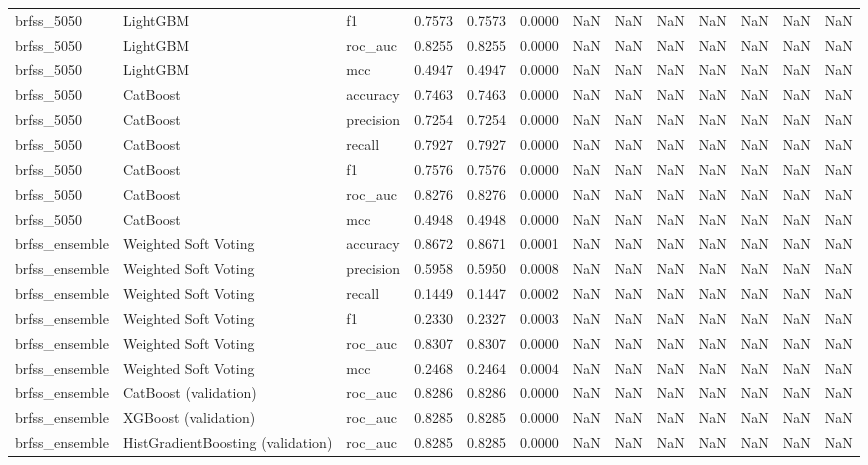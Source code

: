 \begin{tabular}{lllrrrllrrrrr}
brfss\_5050 & LightGBM & f1 & 0.7573 & 0.7573 & 0.0000 & NaN & NaN & NaN & NaN & NaN & NaN & NaN \\
brfss\_5050 & LightGBM & roc\_auc & 0.8255 & 0.8255 & 0.0000 & NaN & NaN & NaN & NaN & NaN & NaN & NaN \\
brfss\_5050 & LightGBM & mcc & 0.4947 & 0.4947 & 0.0000 & NaN & NaN & NaN & NaN & NaN & NaN & NaN \\
brfss\_5050 & CatBoost & accuracy & 0.7463 & 0.7463 & 0.0000 & NaN & NaN & NaN & NaN & NaN & NaN & NaN \\
brfss\_5050 & CatBoost & precision & 0.7254 & 0.7254 & 0.0000 & NaN & NaN & NaN & NaN & NaN & NaN & NaN \\
brfss\_5050 & CatBoost & recall & 0.7927 & 0.7927 & 0.0000 & NaN & NaN & NaN & NaN & NaN & NaN & NaN \\
brfss\_5050 & CatBoost & f1 & 0.7576 & 0.7576 & 0.0000 & NaN & NaN & NaN & NaN & NaN & NaN & NaN \\
brfss\_5050 & CatBoost & roc\_auc & 0.8276 & 0.8276 & 0.0000 & NaN & NaN & NaN & NaN & NaN & NaN & NaN \\
brfss\_5050 & CatBoost & mcc & 0.4948 & 0.4948 & 0.0000 & NaN & NaN & NaN & NaN & NaN & NaN & NaN \\
brfss\_ensemble & Weighted Soft Voting & accuracy & 0.8672 & 0.8671 & 0.0001 & NaN & NaN & NaN & NaN & NaN & NaN & NaN \\
brfss\_ensemble & Weighted Soft Voting & precision & 0.5958 & 0.5950 & 0.0008 & NaN & NaN & NaN & NaN & NaN & NaN & NaN \\
brfss\_ensemble & Weighted Soft Voting & recall & 0.1449 & 0.1447 & 0.0002 & NaN & NaN & NaN & NaN & NaN & NaN & NaN \\
brfss\_ensemble & Weighted Soft Voting & f1 & 0.2330 & 0.2327 & 0.0003 & NaN & NaN & NaN & NaN & NaN & NaN & NaN \\
brfss\_ensemble & Weighted Soft Voting & roc\_auc & 0.8307 & 0.8307 & 0.0000 & NaN & NaN & NaN & NaN & NaN & NaN & NaN \\
brfss\_ensemble & Weighted Soft Voting & mcc & 0.2468 & 0.2464 & 0.0004 & NaN & NaN & NaN & NaN & NaN & NaN & NaN \\
brfss\_ensemble & CatBoost (validation) & roc\_auc & 0.8286 & 0.8286 & 0.0000 & NaN & NaN & NaN & NaN & NaN & NaN & NaN \\
brfss\_ensemble & XGBoost (validation) & roc\_auc & 0.8285 & 0.8285 & 0.0000 & NaN & NaN & NaN & NaN & NaN & NaN & NaN \\
brfss\_ensemble & HistGradientBoosting (validation) & roc\_auc & 0.8285 & 0.8285 & 0.0000 & NaN & NaN & NaN & NaN & NaN & NaN & NaN \\

\end{tabular}
